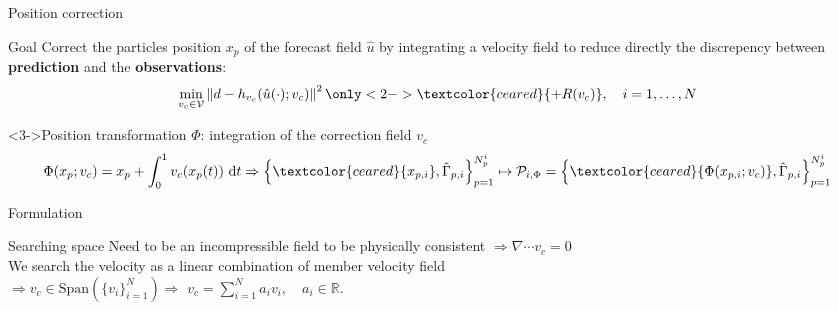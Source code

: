 \documentclass[aspectratio=169]{beamer} %
\begin{document}
\begin{frame}{Position correction}
    \begin{block}{Goal}
        Correct the particles position $x_p$ of the forecast field $\hat u$ by integrating a velocity field to reduce directly the discrepency between \textbf{prediction} and the \textbf{observations}:
        \begin{equation*}
            \min_{v_c \in \mathcal V} \left\|d - h_{v_c}(\hat u(\cdot); v_c) \right\|^2 \only<2->{\textcolor{ceared}{+ R(v_c)}}, \quad i = 1, \dots, N
        \end{equation*}
    \end{block}

    \begin{block}<3->{Position transformation $\Phi$: integration of the correction field $v_c$}
        \begin{equation*}
            \Phi(x_p; v_c) = x_p + \int_{0}^{1} v_c(x_p(t))~\mathrm{d}t \Rightarrow \left\{\textcolor{ceared}{x_{p,i}}, \hat \Gamma_{p,i}\right\}_{p=1}^{N^i_p} \mapsto \mathcal{P}_{i, \Phi} = \left\{\textcolor{ceared}{\Phi(x_{p,i}; v_c)}, \hat \Gamma_{p,i}\right\}_{p=1}^{N^i_p}
        \end{equation*}
    \end{block}
\end{frame}

\begin{frame}{Formulation}

    \begin{block}{Searching space}
        Need to be an incompressible field to be physically consistent $\Rightarrow \nabla \cdots v_c = 0$ \\
        We search the velocity as a linear combination of member velocity field  \\
        $\Rightarrow v_c \in \mathrm{Span}\left(\{v_i\}_{i=1}^{N}\right) \Rightarrow$ $v_c = \sum_{i=1}^N a_i v_i, \quad a_i \in \mathbb{R}$.
    \end{block}

    \vfill
\end{frame}
\end{document}
